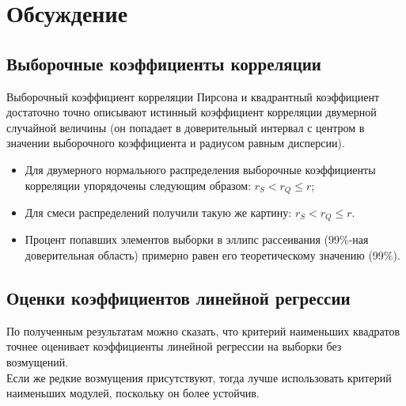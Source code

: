 \section{Обсуждение}
\subsection{Выборочные коэффициенты корреляции}
\begin{flushleft}
	Выборочный коэффициент корреляции Пирсона и квадрантный коэффициент достаточно точно описывают истинный коэффициент корреляции двумерной случайной величины (он попадает в доверительный интервал с центром в значении выборочного коэффициента и радиусом равным дисперсии).\\  
	\begin{itemize}
		\item Для двумерного нормального распределения выборочные коэффициенты корреляции упорядочены следующим образом: $r_{S} < r_{Q} \leq r$;
		\item Для смеси распределений получили такую же картину: $r_{S} < r_{Q} \leq r$.
		\item Процент попавших элементов выборки в эллипс рассеивания (99$\%$-ная доверительная область) примерно равен его теоретическому значению (99$\%$).
	\end{itemize}
\end{flushleft}

\subsection{Оценки коэффициентов линейной регрессии}
\begin{flushleft}
	По полученным результатам можно сказать, что критерий наименьших квадратов точнее оценивает коэффициенты линейной регрессии на выборки без возмущений. \\
	Если же редкие возмущения присутствуют, тогда лучше использовать критерий наименьших модулей, поскольку он более устойчив.
\end{flushleft}

